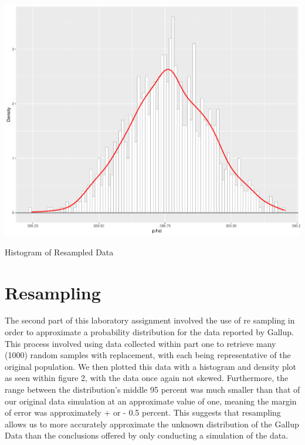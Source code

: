 \documentclass{article}\usepackage[]{graphicx}\usepackage[]{xcolor}
\newenvironment{Figure}
  {\par\medskip\noindent\minipage{\linewidth}}
  {\endminipage\par\medskip}
\begin{document}
\begin{multicols}{2}
\begin{Figure}
\includegraphics[scale=0.6]{Resampling Plot.pdf}
\caption{Histogram of Resampled Data}
\label{fig1}
\end{Figure}

\section{Resampling}
The second part of this laboratory assignment involved the use of re sampling in order to approximate a probability distribution for the data reported by Gallup. This process involved using data collected within part one to retrieve many (1000) random samples with replacement, with each being representative of the original population. We then plotted this data with a histogram and density plot as seen within figure 2, with the data once again not skewed. Furthermore, the range between the distribution's middle 95 percent was much smaller than that of our original data simulation at an approximate value of one, meaning the margin of error was approximately + or - 0.5 percent. This suggests that resampling allows us to more accurately approximate the unknown distribution of the Gallup Data than the conclusions offered by only conducting a simulation of the data.




\end{multicols}
\end{document}
